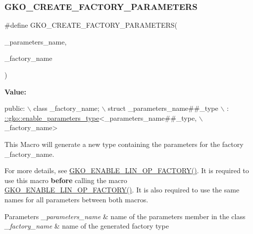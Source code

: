 \subsubsection{\texorpdfstring{G\+K\+O\+\_\+\+C\+R\+E\+A\+T\+E\+\_\+\+F\+A\+C\+T\+O\+R\+Y\+\_\+\+P\+A\+R\+A\+M\+E\+T\+E\+RS}{GKO\_CREATE\_FACTORY\_PARAMETERS}}
{\footnotesize\ttfamily \#define G\+K\+O\+\_\+\+C\+R\+E\+A\+T\+E\+\_\+\+F\+A\+C\+T\+O\+R\+Y\+\_\+\+P\+A\+R\+A\+M\+E\+T\+E\+RS(\begin{DoxyParamCaption}\item[{}]{\+\_\+parameters\+\_\+name,  }\item[{}]{\+\_\+factory\+\_\+name }\end{DoxyParamCaption})}

{\bfseries Value\+:}
\begin{DoxyCode}
\textcolor{keyword}{public}:                                                                \(\backslash\)
    class \_factory\_name;                                               \(\backslash\)
    struct \_parameters\_name##\_type                                     \(\backslash\)
        : \hyperlink{structgko_1_1enable__parameters__type}{::gko::enable\_parameters\_type}<\_parameters\_name##\_type,       \(\backslash\)
                                        \_factory\_name>
\end{DoxyCode}


This Macro will generate a new type containing the parameters for the factory {\ttfamily \+\_\+factory\+\_\+name}. 

For more details, see \hyperlink{group__LinOp_ga8e0af90ec2414b768266f77cedffc309}{G\+K\+O\+\_\+\+E\+N\+A\+B\+L\+E\+\_\+\+L\+I\+N\+\_\+\+O\+P\+\_\+\+F\+A\+C\+T\+O\+R\+Y()}. It is required to use this macro {\bfseries before} calling the macro \hyperlink{group__LinOp_ga8e0af90ec2414b768266f77cedffc309}{G\+K\+O\+\_\+\+E\+N\+A\+B\+L\+E\+\_\+\+L\+I\+N\+\_\+\+O\+P\+\_\+\+F\+A\+C\+T\+O\+R\+Y()}. It is also required to use the same names for all parameters between both macros.


\begin{DoxyParams}{Parameters}
{\em \+\_\+parameters\+\_\+name} & name of the parameters member in the class \\
\hline
{\em \+\_\+factory\+\_\+name} & name of the generated factory type \\
\hline
\end{DoxyParams}
\mbox{\label{group__LinOp_ga521f65604cc4cf427dcb2ecfa49b757c}} 
